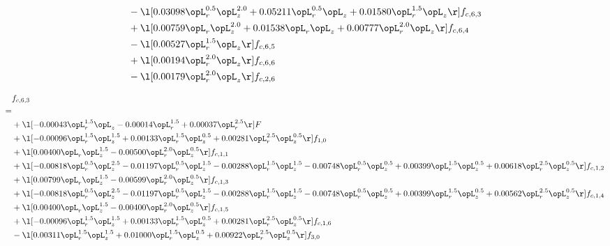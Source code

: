 \begin{alignat}{2}
& - \l[  0.03098 \opL_r^{0.5} \opL_z^{2.0} +  0.05211 \opL_r^{0.5} \opL_z +  0.01580 \opL_r^{1.5} \opL_z  \r] f_{c,6,3} \nonumber \\ 
& + \l[  0.00759 \opL_r \opL_z^{2.0} +  0.01538 \opL_r \opL_z +  0.00777 \opL_r^{2.0} \opL_z  \r] f_{c,6,4} \nonumber \\ 
& - \l[  0.00527 \opL_r^{1.5} \opL_z  \r] f_{c,6,5} \nonumber \\ 
& + \l[  0.00194 \opL_r^{2.0} \opL_z  \r] f_{c,6,6} \nonumber \\ 
& - \l[  0.00179 \opL_r^{2.0} \opL_z  \r] f_{c,2,6} \nonumber \\ 
\end{alignat} 


\begin{alignat}{2} 
\label{eq:f_63_1} 
& f_{c,6,3} \nonumber \\ 
 = \\ 
& + \l[  -0.00043 \opL_r^{1.5} \opL_z   -0.00014 \opL_r^{1.5} +  0.00037 \opL_r^{2.5}  \r] F \nonumber \\ 
& + \l[  -0.00096 \opL_r^{1.5} \opL_z^{1.5} +  0.00133 \opL_r^{1.5} \opL_z^{0.5} +  0.00281 \opL_r^{2.5} \opL_z^{0.5}  \r] f_{1,0} \nonumber \\ 
& + \l[  0.00400 \opL_r \opL_z^{1.5}   -0.00500 \opL_r^{2.0} \opL_z^{0.5}  \r] f_{c,1,1} \nonumber \\ 
& + \l[  -0.00818 \opL_r^{0.5} \opL_z^{2.5}   -0.01197 \opL_r^{0.5} \opL_z^{1.5}   -0.00288 \opL_r^{1.5} \opL_z^{1.5}   -0.00748 \opL_r^{0.5} \opL_z^{0.5} +  0.00399 \opL_r^{1.5} \opL_z^{0.5} +  0.00618 \opL_r^{2.5} \opL_z^{0.5}  \r] f_{c,1,2} \nonumber \\ 
& + \l[  0.00799 \opL_r \opL_z^{1.5}   -0.00599 \opL_r^{2.0} \opL_z^{0.5}  \r] f_{c,1,3} \nonumber \\ 
& + \l[  -0.00818 \opL_r^{0.5} \opL_z^{2.5}   -0.01197 \opL_r^{0.5} \opL_z^{1.5}   -0.00288 \opL_r^{1.5} \opL_z^{1.5}   -0.00748 \opL_r^{0.5} \opL_z^{0.5} +  0.00399 \opL_r^{1.5} \opL_z^{0.5} +  0.00562 \opL_r^{2.5} \opL_z^{0.5}  \r] f_{c,1,4} \nonumber \\ 
& + \l[  0.00400 \opL_r \opL_z^{1.5}   -0.00400 \opL_r^{2.0} \opL_z^{0.5}  \r] f_{c,1,5} \nonumber \\ 
& + \l[  -0.00096 \opL_r^{1.5} \opL_z^{1.5} +  0.00133 \opL_r^{1.5} \opL_z^{0.5} +  0.00281 \opL_r^{2.5} \opL_z^{0.5}  \r] f_{c,1,6} \nonumber \\ 
& - \l[  0.00311 \opL_r^{1.5} \opL_z^{1.5} +  0.01000 \opL_r^{1.5} \opL_z^{0.5} +  0.00922 \opL_r^{2.5} \opL_z^{0.5}  \r] f_{3,0} \nonumber \\ 

\end{alignat}

